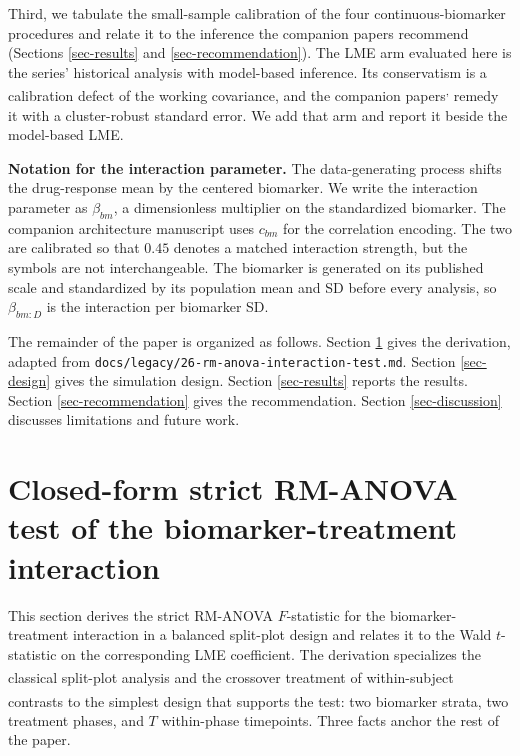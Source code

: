 \documentclass[
  11pt,
]{article}
\begin{document}
Third, we tabulate the small-sample calibration of the four
continuous-biomarker procedures and relate it to the inference the
companion papers recommend (Sections \ref{sec-results} and
\ref{sec-recommendation}). The LME arm evaluated here is the
series' historical analysis with model-based inference. Its
conservatism is a calibration defect of the working covariance,
and the companion papers\textsuperscript{,}
remedy it with a cluster-robust standard error. We add that arm and
report it beside the model-based LME.

\textbf{Notation for the interaction parameter.} The data-generating
process shifts the drug-response mean by the centered biomarker.
We write the interaction parameter as \(\beta_{bm}\), a dimensionless
multiplier on the standardized biomarker. The companion
architecture manuscript uses \(c_{bm}\) for the correlation encoding.
The two are calibrated so that \(0.45\) denotes a matched interaction
strength, but the symbols are not interchangeable. The biomarker is
generated on its published scale and standardized by its population
mean and SD before every analysis, so \(\beta_{bm:D}\) is the
interaction per biomarker SD.

The remainder of the paper is organized as follows. Section
\ref{sec-closed-form} gives the derivation, adapted from
\texttt{docs/legacy/26-rm-anova-interaction-test.md}. Section
\ref{sec-design} gives the simulation design. Section
\ref{sec-results} reports the results. Section
\ref{sec-recommendation} gives the recommendation. Section
\ref{sec-discussion} discusses limitations and future work.

\section{Closed-form strict RM-ANOVA test of the biomarker-treatment interaction}\label{sec-closed-form}

This section derives the strict RM-ANOVA \(F\)-statistic for the
biomarker-treatment interaction in a balanced split-plot design and
relates it to the Wald \(t\)-statistic on the corresponding LME
coefficient. The derivation specializes the classical split-plot
analysis\textsuperscript{} and the crossover treatment of
within-subject contrasts\textsuperscript{} to the simplest design that
supports the test: two biomarker strata, two treatment phases, and \(T\)
within-phase timepoints. Three facts anchor the rest of the paper.
\end{document}
